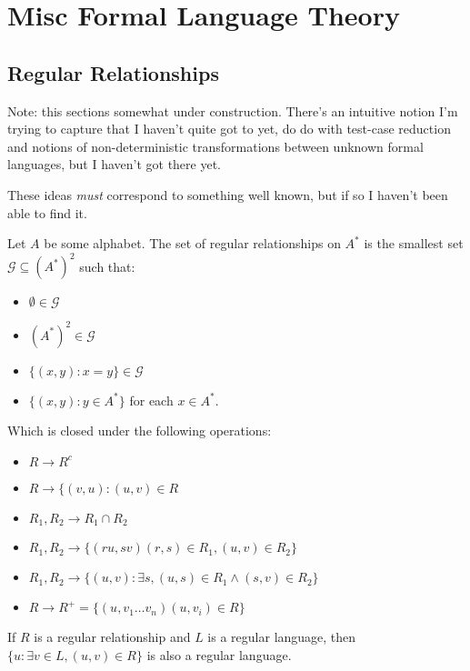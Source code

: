 \chapter{Misc Formal Language Theory}

\section{Regular Relationships}

Note: this sections somewhat under construction.
There's an intuitive notion I'm trying to capture that I haven't quite got to yet,
do do with test-case reduction and notions of non-deterministic transformations between unknown formal languages,
but I haven't got there yet.

These ideas \emph{must} correspond to something well known,
but if so I haven't been able to find it.

\begin{definition}
Let \(A\) be some alphabet. The set of regular relationships on \(A^*\) is the smallest set \(\mathcal{G} \subseteq (A^*)^2\) such that:

\begin{itemize}
\item \(\emptyset \in \mathcal{G}\)
\item \( (A^*)^2 \in \mathcal{G}\)
\item \(\{(x, y): x = y\} \in \mathcal{G}\)
\item \(\{(x, y): y \in A^*\}\) for each \(x \in A^*\).
\end{itemize}

Which is closed under the following operations:

\begin{itemize}
\item \(R \to R^c\)
\item \(R \to \{(v, u): (u, v) \in R\)
\item \(R_1, R_2 \to R_1 \cap R_2\)
\item \(R_1, R_2 \to \{(ru, sv) (r, s) \in R_1, (u, v) \in R_2\}\)
\item \(R_1, R_2 \to \{(u, v): \exists s, (u, s) \in R_1 \wedge (s, v) \in R_2 \} \)
\item \(R \to R^+ = \{(u, v_1 \ldots v_n) (u, v_i) \in R\}\)
\end{itemize}

\end{definition}

\begin{conjecture}
If \(R\) is a regular relationship and \(L\) is a regular language,
then \(\{u: \exists v \in L, (u, v) \in R\}\) is also a regular language.
\end{conjecture}

